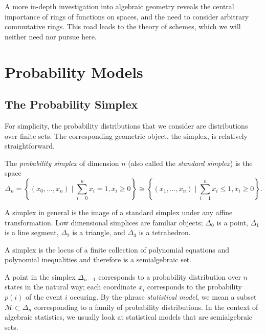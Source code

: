 \documentclass[11pt,titlepage]{article}
\newcommand*{\Mod}{\mathcal{M}}
\newcommand*{\vbar}{\;\big\vert\;}
\begin{document}
    A more in-depth investigation into algebraic geometry reveals the central
    importance of rings of functions on spaces, and the need to consider
    arbitrary commutative rings.  This road leads to the theory of schemes,
    which we will neither need nor pursue here.

\section{Probability Models}
    \subsection{The Probability Simplex}
    For simplicity, the probability distributions that we consider are
    distributions over finite sets.  The corresponding geometric object, the
    simplex, is relatively straightforward.  
    
    \begin{definition} The \emph{probability simplex} of dimension $n$ (also
    called the \emph{standard simplex}) is the space
    \[
        \Delta_{n} = 
        \left\{(x_0, \ldots, x_{n}) \vbar \sum_{i=0}^{n} x_i= 1, x_i \ge 0 \right\} 
        \cong 
        \left\{(x_1, \ldots, x_{n}) \vbar \sum_{i=1}^{n} x_i \le 1, x_i
        \ge 0 \right\}.
    \]
    \end{definition}
    A simplex in general is the image of a standard simplex under any affine
    transformation.  Low dimensional simplices are familiar objects; $\Delta_0$
    is a point, $\Delta_1$ is a line segment, $\Delta_2$ is a triangle,
    and $\Delta_3$ is a tetrahedron.
    \begin{center}
    \end{center}
    A simplex is the locus of a finite collection of polynomial equations and
    polynomial inequalities and therefore is a semialgebraic set.

    A point in the simplex $\Delta_{n-1}$ corresponds to a probability
    distribution over $n$ states in the natural way; each coordinate $x_i$
    corresponds to the probability $p(i)$ of the event $i$ occuring.  By the
    phrase \emph{statistical model}, we mean a subset $\Mod \subset \Delta_n$
    corresponding to a family of probability distributions.  In the context of
    algebraic statistics, we usually look at statistical models that are
    semialgebraic sets.
\end{document}
